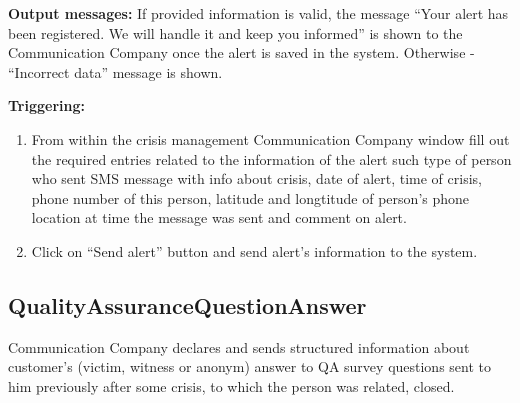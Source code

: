 \begin{description}
\item \textbf{Output messages:} If provided information is valid, the message
``Your alert has been registered. We will handle it and keep you informed'' is
shown to the Communication Company once the alert is saved in the system.
Otherwise - ``Incorrect data'' message is shown.

\item \textbf{Triggering:}
\begin{enumerate}
\item From within the crisis management Communication Company window fill out
the required entries related to the information of the alert such type of
person who sent SMS message with info about crisis, date of alert, time of
crisis, phone number of this person, latitude and longtitude of person's phone
location at time the message was sent and comment on alert.
\item Click on ``Send alert'' button and send alert's information to the system.
\end{enumerate}

\end{description}

\subsection{QualityAssuranceQuestionAnswer}

Communication Company declares and sends structured information about customer's
(victim, witness or anonym) answer to QA survey questions sent to him previously
after some crisis, to which the person was related, closed.

